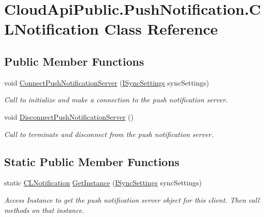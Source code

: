 \hypertarget{class_cloud_api_public_1_1_push_notification_1_1_c_l_notification}{\section{Cloud\-Api\-Public.\-Push\-Notification.\-C\-L\-Notification Class Reference}
\label{class_cloud_api_public_1_1_push_notification_1_1_c_l_notification}
}
\subsection*{Public Member Functions}
\begin{DoxyCompactItemize}
\item 
void \hyperlink{class_cloud_api_public_1_1_push_notification_1_1_c_l_notification_abd048f806309e9be145f026218946731}{Connect\-Push\-Notification\-Server} (\hyperlink{interface_cloud_api_public_1_1_interfaces_1_1_i_sync_settings}{I\-Sync\-Settings} sync\-Settings)
\begin{DoxyCompactList}\small\item\em Call to initialize and make a connection to the push notification server. \end{DoxyCompactList}\item 
void \hyperlink{class_cloud_api_public_1_1_push_notification_1_1_c_l_notification_a121fca2675b1ac57dac038554edf8fb9}{Disconnect\-Push\-Notification\-Server} ()
\begin{DoxyCompactList}\small\item\em Call to terminate and disconnect from the push notification server. \end{DoxyCompactList}\end{DoxyCompactItemize}
\subsection*{Static Public Member Functions}
\begin{DoxyCompactItemize}
\item 
static \hyperlink{class_cloud_api_public_1_1_push_notification_1_1_c_l_notification}{C\-L\-Notification} \hyperlink{class_cloud_api_public_1_1_push_notification_1_1_c_l_notification_ae43f349b8c7987fc76686b2f89f3223b}{Get\-Instance} (\hyperlink{interface_cloud_api_public_1_1_interfaces_1_1_i_sync_settings}{I\-Sync\-Settings} sync\-Settings)
\begin{DoxyCompactList}\small\item\em Access Instance to get the push notification server object for this client. Then call methods on that instance. \end{DoxyCompactList}\end{DoxyCompactItemize}
